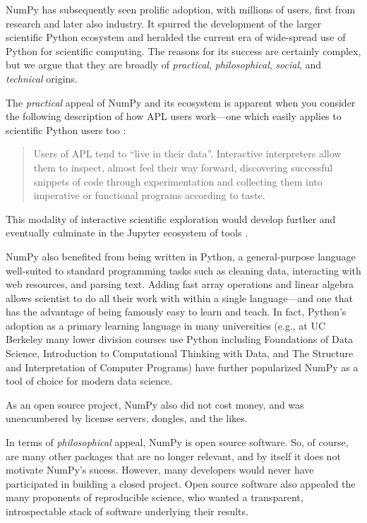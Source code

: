 NumPy has subsequently seen prolific adoption, with millions of users,
first from research and later also industry.  It spurred the
development of the larger scientific Python ecosystem and heralded the
current era of wide-spread use of Python for scientific computing. The
reasons for its success are certainly complex, but we argue that they
are broadly of \emph{practical}, \emph{philosophical},
\emph{social}, and \emph{technical} origins.


The \emph{practical} appeal of NumPy and its ecosystem is apparent
when you consider the following description of how APL users
work---one which
easily applies to scientific Python users too \cite{kromberg2007apl}:
\begin{quote}
Users of APL tend to ``live in their data''. Interactive interpreters allow them
to inspect, almost feel their  way forward, discovering successful snippets
of code through experimentation and collecting them
into imperative or functional programs according to taste.
\end{quote}
This modality of interactive scientific exploration would develop
further and eventually culminate in the Jupyter ecosystem of tools \cite{Kluyver:2016aa}.

NumPy also benefited from being written in Python, a
general-purpose language well-suited to standard programming tasks such as
cleaning data, interacting with web resources, and parsing text.
Adding fast array operations and linear algebra allows scientist to do all
their work with within a single language---and one that has the advantage of
being famously easy to learn and teach.  In fact, Python's adoption as
a primary learning language in many universities (e.g., at UC Berkeley
many lower division courses use Python including Foundations of Data Science,
Introduction to Computational Thinking with Data,
and The Structure and Interpretation of Computer Programs) have
further popularized NumPy as a tool of choice for modern data science.

As an open source project, NumPy also did not cost money, and was
unencumbered by license servers, dongles, and the likes.

In terms of \emph{philosophical} appeal, NumPy is open source
software.  So, of course, are many other packages that are no longer
relevant, and by itself it does not motivate NumPy's sucess. However,
many developers would never have participated in building a closed
project.  Open source software also appealed the many proponents of
reproducible science, who wanted a transparent, introspectable stack
of software underlying their results.

